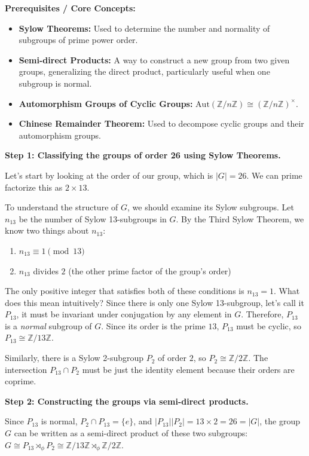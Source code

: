 \begin{solution}
\textbf{Prerequisites / Core Concepts:}
\begin{itemize}
    \item \textbf{Sylow Theorems:} Used to determine the number and normality of subgroups of prime power order.
    \item \textbf{Semi-direct Products:} A way to construct a new group from two given groups, generalizing the direct product, particularly useful when one subgroup is normal.
    \item \textbf{Automorphism Groups of Cyclic Groups:} $\text{Aut}(\mathbb{Z}/n\mathbb{Z}) \cong (\mathbb{Z}/n\mathbb{Z})^\times$.
    \item \textbf{Chinese Remainder Theorem:} Used to decompose cyclic groups and their automorphism groups.
\end{itemize}

\textbf{Step 1: Classifying the groups of order 26 using Sylow Theorems.}

Let's start by looking at the order of our group, which is $|G| = 26$. We can prime factorize this as $2 \times 13$.

To understand the structure of $G$, we should examine its Sylow subgroups. Let $n_{13}$ be the number of Sylow 13-subgroups in $G$. By the Third Sylow Theorem, we know two things about $n_{13}$:
\begin{enumerate}
    \item $n_{13} \equiv 1 \pmod{13}$
    \item $n_{13}$ divides $2$ (the other prime factor of the group's order)
\end{enumerate}

The only positive integer that satisfies both of these conditions is $n_{13} = 1$. What does this mean intuitively? Since there is only one Sylow 13-subgroup, let's call it $P_{13}$, it must be invariant under conjugation by any element in $G$. Therefore, $P_{13}$ is a \textit{normal} subgroup of $G$. Since its order is the prime $13$, $P_{13}$ must be cyclic, so $P_{13} \cong \mathbb{Z}/13\mathbb{Z}$.

Similarly, there is a Sylow 2-subgroup $P_2$ of order $2$, so $P_2 \cong \mathbb{Z}/2\mathbb{Z}$. The intersection $P_{13} \cap P_2$ must be just the identity element because their orders are coprime.

\textbf{Step 2: Constructing the groups via semi-direct products.}

Since $P_{13}$ is normal, $P_2 \cap P_{13} = \{e\}$, and $|P_{13}||P_2| = 13 \times 2 = 26 = |G|$, the group $G$ can be written as a semi-direct product of these two subgroups: $G \cong P_{13} \rtimes_\phi P_2 \cong \mathbb{Z}/13\mathbb{Z} \rtimes_\phi \mathbb{Z}/2\mathbb{Z}$.


\end{solution}
